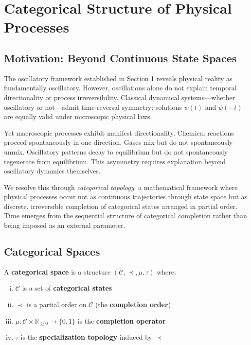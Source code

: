 \section{Categorical Structure of Physical Processes}

\subsection{Motivation: Beyond Continuous State Spaces}

The oscillatory framework established in Section 1 reveals physical reality as fundamentally oscillatory. However, oscillations alone do not explain temporal directionality or process irreversibility. Classical dynamical systems—whether oscillatory or not—admit time-reversal symmetry: solutions $\psi(t)$ and $\psi(-t)$ are equally valid under microscopic physical laws.

Yet macroscopic processes exhibit manifest directionality. Chemical reactions proceed spontaneously in one direction. Gases mix but do not spontaneously unmix. Oscillatory patterns decay to equilibrium but do not spontaneously regenerate from equilibrium. This asymmetry requires explanation beyond oscillatory dynamics themselves.

We resolve this through \textit{categorical topology}: a mathematical framework where physical processes occur not as continuous trajectories through state space but as discrete, irreversible completion of categorical states arranged in partial order. Time emerges from the sequential structure of categorical completion rather than being imposed as an external parameter.

\subsection{Categorical Spaces}

\begin{definition}
\label{def:categorical_space}
A \textbf{categorical space} is a structure $(\mathcal{C}, \prec, \mu, \tau)$ where:
\begin{enumerate}[(i)]
\item $\mathcal{C}$ is a set of \textbf{categorical states}
\item $\prec$ is a partial order on $\mathcal{C}$ (the \textbf{completion order})
\item $\mu: \mathcal{C} \times \mathbb{R}_{\geq 0} \to \{0, 1\}$ is the \textbf{completion operator}
\item $\tau$ is the \textbf{specialization topology} induced by $\prec$
\end{enumerate}
\end{definition}


